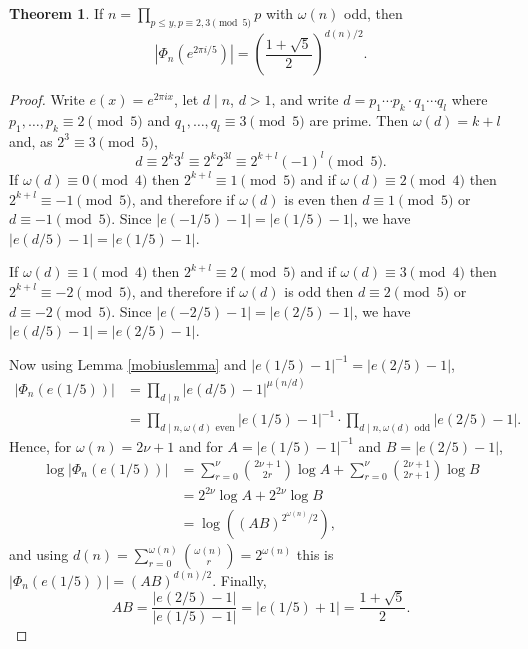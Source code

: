 \documentclass{article}
\theoremstyle{definition}
\newtheorem{theorem}{Theorem}
\theoremstyle{definition}
\begin{document}
\begin{theorem}
If $n=\prod_{p \leq y, p \equiv 2,3 \pmod{5}} p$ with $\omega(n)$  odd, then
\[
|\Phi_n(e^{2\pi i/5})| = \left( \frac{1+\sqrt{5}}{2} \right)^{d(n)/2}.
\]
\label{demr}
\end{theorem}
\begin{proof}
Write $e(x)=e^{2\pi ix}$, let $d \mid n$, $d>1$, and write $d=p_1\cdots p_k \cdot q_1 \cdots q_l$ where
$p_1,\ldots,p_k \equiv 2 \pmod{5}$ and $q_1,\ldots,q_l \equiv 3 \pmod{5}$ are prime. Then
$\omega(d) = k+l$ and, as $2^3 \equiv 3 \pmod{5}$,
\[
d \equiv 2^k 3^l \equiv 2^k 2^{3l} \equiv 2^{k+l} (-1)^l \pmod{5}.
\]
If $\omega(d) \equiv 0 \pmod{4}$ then $2^{k+l} \equiv 1 \pmod{5}$
and if $\omega(d) \equiv 2 \pmod{4}$ then
$2^{k+l}  \equiv -1 \pmod{5}$, and therefore if $\omega(d)$ is even then 
$d \equiv 1 \pmod{5}$ or $d \equiv -1 \pmod{5}$. Since $|e(-1/5)-1|=|e(1/5)-1|$, we have
$|e(d/5)-1| = |e(1/5)-1|$.

If $\omega(d) \equiv 1 \pmod{4}$ then $2^{k+l} \equiv 2 \pmod{5}$ and if $\omega(d) \equiv 3 \pmod{4}$ then
$2^{k+l} \equiv -2 \pmod{5}$, and therefore if $\omega(d)$ is odd then
$d \equiv 2 \pmod{5}$ or $d \equiv -2 \pmod{5}$. Since $|e(-2/5)-1|=|e(2/5)-1|$, we have
$|e(d/5)-1| = |e(2/5)-1|$.

Now using Lemma \ref{mobiuslemma} and $|e(1/5)-1|^{-1} =  |e(2/5)-1|$,
\begin{align*}
|\Phi_n(e(1/5))|&=\prod_{d \mid n} |e(d/5)-1|^{\mu(n/d)}\\
&=\prod_{d \mid n, \textrm{$\omega(d)$ even}}  |e(1/5)-1|^{-1}
\cdot \prod_{d \mid n, \textrm{$\omega(d)$ odd}}  |e(2/5)-1|.
\end{align*}
Hence, for $\omega(n)=2\nu+1$ and for $A= |e(1/5)-1|^{-1}$ and $B=|e(2/5)-1|$,
\begin{align*}
\log |\Phi_n(e(1/5))|&=\sum_{r=0}^\nu \binom{2\nu+1}{2r} \log A + \sum_{r=0}^\nu \binom{2\nu+1}{2r+1} \log B\\
&=2^{2\nu} \log A + 2^{2\nu} \log B\\
&=\log((AB)^{2^{\omega(n)} /2}),
\end{align*}
and using $d(n)=\sum_{r=0}^{\omega(n)} \binom{\omega(n)}{r} = 2^{\omega(n)}$ this is $|\Phi_n(e(1/5))| = (AB)^{d(n)/2}$.
Finally,
\[
AB = \frac{|e(2/5)-1|}{|e(1/5)-1|} =|e(1/5)+1|= \frac{1+\sqrt{5}}{2}.
\]
\end{proof}
\end{document}
